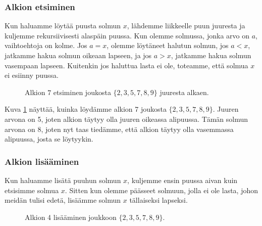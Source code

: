 \subsubsection{Alkion etsiminen}

Kun haluamme löytää puusta solmun $x$, lähdemme liikkeelle
puun juuresta ja kuljemme rekursiivisesti alaspäin puussa.
Kun olemme solmussa, jonka arvo on $a$,
vaihtoehtoja on kolme.
Jos $a=x$, olemme löytäneet halutun solmun,
jos $a<x$, jatkamme hakua solmun oikeaan lapseen,
ja jos $a>x$, jatkamme hakua solmun vasempaan lapseen.
Kuitenkin jos haluttua lasta ei ole, toteamme,
että solmua $x$ ei esiinny puussa.

\begin{figure}
\center
{}
\caption{Alkion $7$ etsiminen joukosta $\{2,3,5,7,8,9\}$ juuresta alkaen.}
\label{fig:bihets}
\end{figure}

Kuva \ref{fig:bihets} näyttää, kuinka löydämme alkion 7
joukosta $\{2,3,5,7,8,9\}$.
Juuren arvona on 5, joten alkion täytyy olla juuren
oikeassa alipuussa.
Tämän solmun arvona on 8,
joten nyt taas tiedämme, että alkion täytyy olla
vasemmassa alipuussa, josta se löytyykin.

\subsubsection{Alkion lisääminen}

Kun haluamme lisätä puuhun solmun $x$, kuljemme ensin
puussa aivan kuin etsisimme solmua $x$.
Sitten kun olemme päässeet solmuun,
jolla ei ole lasta, johon meidän tulisi edetä,
lisäämme solmun $x$ tällaiseksi lapseksi.

\begin{figure}
\center
{}
\caption{Alkion 4 lisääminen joukkoon $\{2,3,5,7,8,9\}$.}
\label{fig:bihpu2}
\end{figure}

